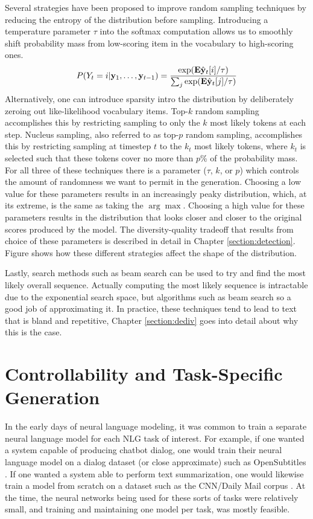 Several strategies have been proposed to improve random sampling techniques by reducing the entropy of the distribution before sampling.
Introducing a temperature parameter $\tau$ into the softmax computation allows us to smoothly shift probability mass from low-scoring item in the vocabulary to high-scoring ones.
\begin{align}
    \label{equation:softmax_with_temp}
    P(Y_t=i | \mathbf{y}_1, \ldots, \mathbf{y}_{t-1}) = \frac{\exp(\mathbf{E}\hat{\mathbf{y}}_t[i]/\tau)}{\sum_j\exp(\mathbf{E}\hat{\mathbf{y}}_t[j]/\tau)}
\end{align}
Alternatively, one can introduce sparsity intro the distribution by deliberately zeroing out like-likelihood vocabulary items.
Top-$k$ random sampling accomplishes this by restricting sampling to only the $k$ most likely tokens at each step.
Nucleus sampling, also referred to as top-$p$ random sampling, accomplishes this by restricting sampling at timestep $t$ to the $k_t$ most likely tokens, where $k_t$ is selected such that these tokens cover no more than $p$\% of the probability mass.
For all three of these techniques there is a parameter ($\tau$, $k$, or $p$) which controls the amount of randomness we want to permit in the generation.
Choosing a low value for these parameters results in an increasingly peaky distribution, which, at its extreme, is the same as taking the $\arg \max$. 
Choosing a high value for these parameters results in the distribution that looks closer and closer to the original scores produced by the model.
The diversity-quality tradeoff that results from choice of these parameters is described in detail in Chapter \ref{section:detection}.
Figure  shows how these different strategies affect the shape of the distribution.

Lastly, search methods such as beam search can be used to try and find the most likely overall sequence.
Actually computing the most likely sequence is intractable due to the exponential search space, but algorithms such as beam search so a good job of approximating it.
In practice, these techniques tend to lead to text that is bland and repetitive,
Chapter \ref{section:dediv} goes into detail about why this is the case.

\section{Controllability and Task-Specific Generation}

In the early days of neural language modeling, it was common to train a separate neural language model for each NLG task of interest.
For example, if one wanted a system capable of producing chatbot dialog, one would train their neural language model on a dialog dataset (or close approximate) such as OpenSubtitles \citep{vinyals2015neural}.
If one wanted a system able to perform text summarization, one would likewise train a model from scratch on a dataset such as the CNN/Daily Mail corpus \cite{nallapati2016abstractive,DBLP:journals/corr/SeeLM17}.
At the time, the neural networks being used for these sorts of tasks were relatively small, and training and maintaining one model per task, was mostly feasible.

